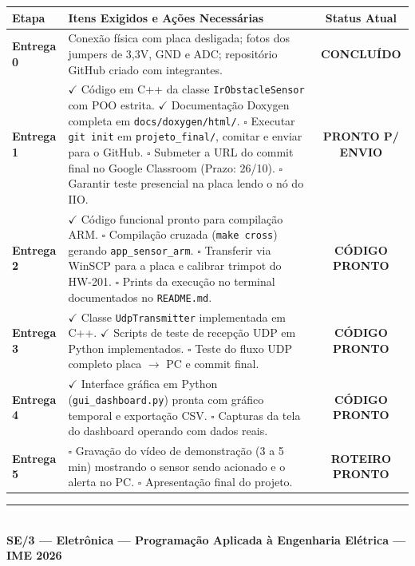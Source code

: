 \documentclass[11pt,a4paper]{article}
\begin{document}
\begin{center}
\begin{tabular}{lp{9.5cm}c}
    \toprule
    \textbf{Etapa} & \textbf{Itens Exigidos e Ações Necessárias} & \textbf{Status Atual} \\
    \midrule
    \textbf{Entrega 0} & Conexão física com placa desligada; fotos dos jumpers de 3,3V, GND e ADC; repositório GitHub criado com integrantes. & \textbf{CONCLUÍDO} \\
    \midrule
    \textbf{Entrega 1} & $\checkmark$ Código em C++ da classe \texttt{IrObstacleSensor} com POO estrita. \newline
    $\checkmark$ Documentação Doxygen completa em \texttt{docs/doxygen/html/}. \newline
    $\square$ Executar \texttt{git init} em \texttt{projeto\_final/}, comitar e enviar para o GitHub. \newline
    $\square$ Submeter a URL do commit final no Google Classroom (Prazo: 26/10). \newline
    $\square$ Garantir teste presencial na placa lendo o nó do IIO. & \textbf{PRONTO P/ ENVIO} \\
    \midrule
    \textbf{Entrega 2} & $\checkmark$ Código funcional pronto para compilação ARM. \newline
    $\square$ Compilação cruzada (\texttt{make cross}) gerando \texttt{app\_sensor\_arm}. \newline
    $\square$ Transferir via WinSCP para a placa e calibrar trimpot do HW-201. \newline
    $\square$ Prints da execução no terminal documentados no \texttt{README.md}. & \textbf{CÓDIGO PRONTO} \\
    \midrule
    \textbf{Entrega 3} & $\checkmark$ Classe \texttt{UdpTransmitter} implementada em C++. \newline
    $\checkmark$ Scripts de teste de recepção UDP em Python implementados. \newline
    $\square$ Teste do fluxo UDP completo placa $\rightarrow$ PC e commit final. & \textbf{CÓDIGO PRONTO} \\
    \midrule
    \textbf{Entrega 4} & $\checkmark$ Interface gráfica em Python (\texttt{gui\_dashboard.py}) pronta com gráfico temporal e exportação CSV. \newline
    $\square$ Capturas da tela do dashboard operando com dados reais. & \textbf{CÓDIGO PRONTO} \\
    \midrule
    \textbf{Entrega 5} & $\square$ Gravação do vídeo de demonstração (3 a 5 min) mostrando o sensor sendo acionado e o alerta no PC. \newline
    $\square$ Apresentação final do projeto. & \textbf{ROTEIRO PRONTO} \\
    \bottomrule
\end{tabular}
\end{center}

\vspace{0.4cm}
\begin{center}
    \rule{0.6\textwidth}{0.4pt}\\[0.2cm]
    {\small \textbf{SE/3 --- Eletrônica --- Programação Aplicada à Engenharia Elétrica --- IME 2026}}
\end{center}
\end{document}
